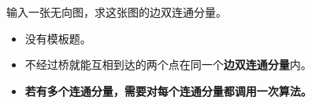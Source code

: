 \noindent 输入一张无向图，求这张图的边双连通分量。

\begin{itemize}
    \item 没有模板题。
    \item 不经过桥就能互相到达的两个点在同一个\textbf{边双连通分量}内。
    \item \textbf{若有多个连通分量，需要对每个连通分量都调用一次算法。}
\end{itemize}